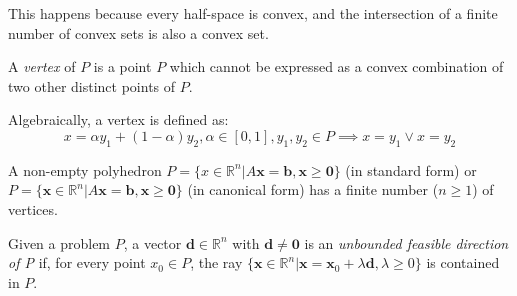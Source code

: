 \documentclass[12pt, a4paper]{report}
\begin{document}
    This happens because every half-space is convex, and the intersection of a finite number of convex sets is also a convex set. 
    \begin{definition}
        A \emph{vertex} of $P$ is a point $P$ which cannot be expressed as a convex combination of two other distinct points of $P$. 
    \end{definition}
    Algebraically, a vertex is defined as: 
    \[x= \alpha y_1+(1-\alpha)y_2, \alpha \in [0,1], y_1,y_2 \in P \implies x=y_1 \lor x=y_2\]
    \begin{example}[Property]
        A non-empty polyhedron $P=\{x \in \mathbb{R}^n|A\boldsymbol{x}=\boldsymbol{b},\boldsymbol{x} \geq \boldsymbol{0}\}$ (in standard form)
        or $P=\{\boldsymbol{x} \in \mathbb{R}^n|A\boldsymbol{x}=\boldsymbol{b},\boldsymbol{x} \geq \boldsymbol{0}\}$ (in canonical form) has a 
        finite number ($n \geq 1$) of vertices. 
    \end{example}
    \begin{definition}
        Given a problem $P$, a vector $\boldsymbol{d} \in \mathbb{R}^n$ with $\boldsymbol{d} \neq \boldsymbol{0}$ is an 
        \emph{unbounded feasible direction of P} if, for every point $x_0 \in P$, the ray $\{\boldsymbol{x} \in \mathbb{R}^n|\boldsymbol{x}=\boldsymbol{x}_0+\lambda\boldsymbol{d},\lambda \geq 0\}$ is contained in $P$.
    \end{definition}
\end{document}
